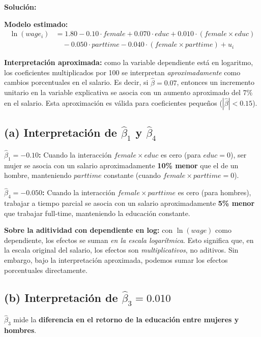 \documentclass[10pt,a4paper]{article}
\begin{document}
\begin{enumerate}
\textbf{Solución:}

\textbf{Modelo estimado:}
\begin{align*}
\ln(wage_i) &= 1.80 - 0.10 \cdot female + 0.070 \cdot educ + 0.010 \cdot (female \times educ) \\
&\quad - 0.050 \cdot parttime - 0.040 \cdot (female \times parttime) + u_i
\end{align*}

\begin{nota}
\textbf{Interpretación aproximada:} como la variable dependiente está en logaritmo, los coeficientes multiplicados por 100 se interpretan \emph{aproximadamente} como cambios porcentuales en el salario. Es decir, si \(\hat{\beta} = 0.07\), entonces un incremento unitario en la variable explicativa se asocia con un aumento aproximado del \(7\%\) en el salario. Esta aproximación es válida para coeficientes pequeños (\(|\hat{\beta}| < 0.15\)).
\end{nota}

\subsection*{(a) Interpretación de \(\hat{\beta}_1\) y \(\hat{\beta}_4\)}

\textbf{\(\hat{\beta}_1 = -0.10\):} Cuando la interacción \(female \times educ\) es cero (para \(educ=0\)), ser mujer se asocia con un salario aproximadamente \textbf{10\% menor} que el de un hombre, manteniendo \(parttime\) constante (cuando \(female \times parttime = 0\)).

\textbf{\(\hat{\beta}_4 = -0.050\):} Cuando la interacción \(female \times parttime\) es cero (para hombres), trabajar a tiempo parcial se asocia con un salario aproximadamente \textbf{5\% menor} que trabajar full-time, manteniendo la educación constante.

\textbf{Sobre la aditividad con dependiente en log:} con \(\ln(wage)\) como dependiente, los efectos se suman \emph{en la escala logarítmica}. Esto significa que, en la escala original del salario, los efectos son \emph{multiplicativos}, no aditivos. Sin embargo, bajo la interpretación aproximada, podemos sumar los efectos porcentuales directamente.

\subsection*{(b) Interpretación de \(\hat{\beta}_3 = 0.010\)}

\(\hat{\beta}_3\) mide la \textbf{diferencia en el retorno de la educación entre mujeres y hombres}.


\end{enumerate}
\end{document}
